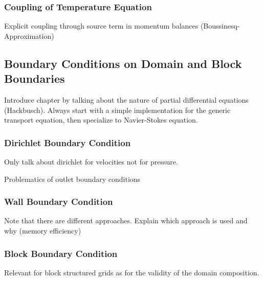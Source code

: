       \subsubsection{Coupling of Temperature Equation}

        Explicit coupling through source term in momentum balances (Boussinesq-Approximation)

    \subsection{Boundary Conditions on Domain and Block Boundaries}

        Introduce chapter by talking about the nature of partial differential equations (Hackbusch). Always start with a simple implementation for the generic transport equation, then specialize to Navier-Stokes equation.

      \subsubsection{Dirichlet Boundary Condition}

        Only talk about dirichlet for velocities not for pressure.


        Problematics of outlet boundary conditions


      \subsubsection{Wall Boundary Condition}

      Note that there are different approaches. Explain which approach is used and why (memory efficiency)

      \subsubsection{Block Boundary Condition}

      Relevant for block structured grids as for the validity of the domain composition.
      
